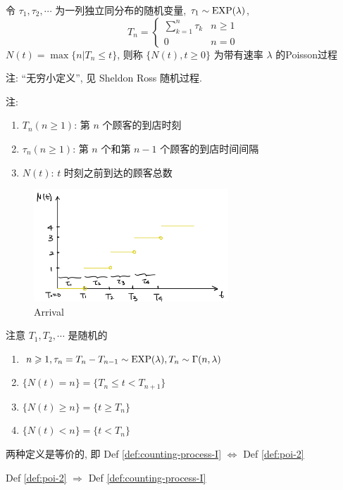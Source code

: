 \begin{definition}\label{def:poi-2}
    令 $\tau_1,\tau_2,\cdots$ 为一列独立同分布的随机变量, $\tau_1\sim \operatorname{EXP}(\lambda)$,
    \[
    T_n=\begin{cases}
        \sum_{k=1}^n\tau_k & n\geq 1\\
        0 & n=0
    \end{cases}
    \]
    $N(t)=\max\{n|T_n\leq t\}$, 则称 $\{N(t),t\geq 0\}$ 为带有速率 $\lambda$ 的Poisson过程
    
    注: ``无穷小定义'', 见 Sheldon Ross 随机过程\cite{ross1995stochastic}.
\end{definition}
注:
\begin{enumerate}
    \item $T_n(n\geq 1)$: 第 $n$ 个顾客的到店时刻
    \item $\tau_n(n\geq 1)$: 第 $n$ 个和第 $n-1$ 个顾客的到店时间间隔
    \item $N(t)$: $t$ 时刻之前到达的顾客总数
\end{enumerate}
\begin{figure}[H]
    \centering
    \includegraphics[width=0.65\textwidth]{figures/arrival.png}
    \caption{Arrival}
\end{figure}
注意 $T_1,T_2,\cdots$ 是随机的
\begin{enumerate}
    \item $n\geqslant 1, \tau_n=T_n-T_{n-1}\sim \operatorname{EXP}(\lambda), T_n\sim\Gamma(n,\lambda)$
    \item $\{N(t)=n\}=\{T_n\leq t< T_{n+1}\}$
    \item $\{N(t)\geq n\}=\{t\geq T_n\}$
    \item $\{N(t)<n\}=\{t<T_n\}$
\end{enumerate}

\begin{theorem}
    两种定义是等价的, 即 Def \ref{def:counting-process-I} $\iff$ Def \ref{def:poi-2}
\end{theorem}

\begin{proposition}
    Def \ref{def:poi-2} $\Rightarrow$ Def \ref{def:counting-process-I}
\end{proposition}

